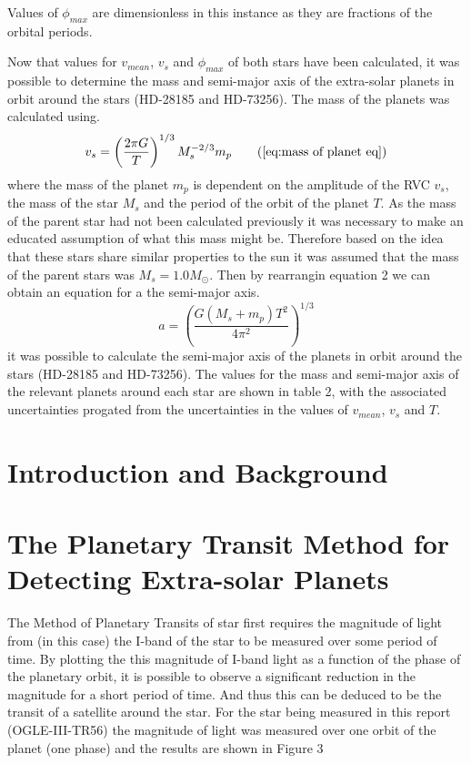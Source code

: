 \documentclass[]{article}
\begin{document}
Values of $\phi_{max}$ are dimensionless in this instance as they are
fractions of the orbital periods.
\par
Now that values for $v_{mean}$, $v_{s}$ and $\phi_{max}$ of both stars have 
been calculated, it was possible to determine the mass and semi-major axis of the
extra-solar planets in orbit around the stars (HD-28185 and HD-73256).
The mass of the planets was calculated using.
\begin{equation}
  v_s = \left(\frac{2\pi G}{T}\right)^{1/3}M_s^{-2/3}m_p \tag{\ref{eq:mass of planet eq}}
\end{equation}
where the mass of the planet $m_p $ is dependent on the amplitude of the RVC $v_{s}$, the mass of the star $M_s$ and the period of the orbit of the planet $T$.
As the mass of the parent star had not been calculated previously it was necessary to
make an educated assumption of what this mass might be. Therefore based on the idea 
that these stars share similar properties to the sun it was assumed that the mass of
the parent stars was $M_s = 1.0M_{\odot}$. Then by rearrangin equation 2 we can 
obtain an equation for a the semi-major axis.
\begin{equation}
  a = \left(\frac{G(M_s+m_p)T^2}{4\pi^2}\right)^{1/3}
  \end{equation}
it was possible to calculate the semi-major axis of the planets in orbit around the
stars (HD-28185 and HD-73256). The values for the mass and semi-major axis of the 
relevant planets around each star are shown in table 2, with the associated 
uncertainties progated from the uncertainties in the values of $v_{mean}$, $v_{s}$
and $T$.


  \par
  



\section*{Introduction and Background}

\section*{The Planetary Transit Method for Detecting Extra-solar Planets}
The Method of Planetary Transits of star first requires
the magnitude of light from (in this case) the I-band of 
the star to be measured over some period of time.
By plotting the this magnitude of I-band light as a 
function of the phase of the planetary orbit, it is 
possible to observe a significant reduction in the 
magnitude for a short period of time. And thus this can be 
deduced to be the transit of a satellite around the star.
For the star being measured in this report (OGLE-III-TR56)
the magnitude of light was measured over one orbit of the 
planet (one phase) and the results are shown in Figure 3
\end{document}
